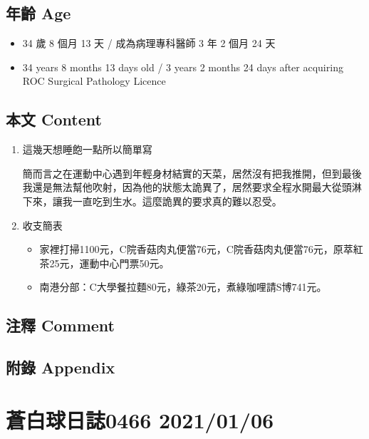 \documentclass[a5paper, 11pt
]{book}
\providecommand{\tightlist}{%
  \setlength{\itemsep}{0pt}\setlength{\parskip}{0pt}}
\begin{document}
\hypertarget{ux5e74ux9f61-age-35}{%
\subsection{年齡 Age}\label{ux5e74ux9f61-age-35}}

\begin{itemize}
\tightlist
\item
  34 歲 8 個月 13 天 / 成為病理專科醫師 3 年 2 個月 24 天
\item
  34 years 8 months 13 days old / 3 years 2 months 24 days after
  acquiring ROC Surgical Pathology Licence
\end{itemize}

\hypertarget{ux672cux6587-content-35}{%
\subsection{本文 Content}\label{ux672cux6587-content-35}}

\begin{enumerate}
\def\labelenumi{\arabic{enumi}.}
\item
  這幾天想睡飽一點所以簡單寫

  簡而言之在運動中心遇到年輕身材結實的天菜，居然沒有把我推開，但到最後我還是無法幫他吹射，因為他的狀態太詭異了，居然要求全程水開最大從頭淋下來，讓我一直吃到生水。這麼詭異的要求真的難以忍受。
\item
  收支簡表

  \begin{itemize}
  \tightlist
  \item
    家裡打掃1100元，C院香菇肉丸便當76元，C院香菇肉丸便當76元，原萃紅茶25元，運動中心門票50元。
  \item
    南港分部：C大學餐拉麵80元，綠茶20元，煮綠咖哩請S博741元。
  \end{itemize}
\end{enumerate}

\hypertarget{ux6ce8ux91cb-comment-35}{%
\subsection{注釋 Comment}\label{ux6ce8ux91cb-comment-35}}

\hypertarget{ux9644ux9304-appendix-35}{%
\subsection{附錄 Appendix}\label{ux9644ux9304-appendix-35}}

\hypertarget{ux84bcux767dux7403ux65e5ux8a8c0466-20210106}{%
\section{蒼白球日誌0466
2021/01/06}\label{ux84bcux767dux7403ux65e5ux8a8c0466-20210106}}
\end{document}
